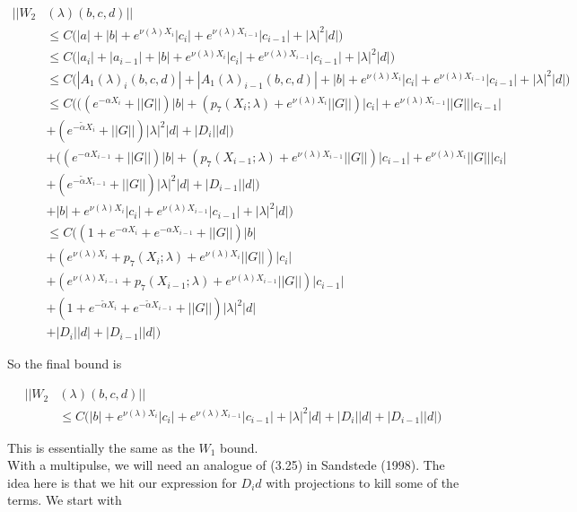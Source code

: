 \documentclass[12pt]{article}
\begin{document}
\begin{align*}
||W_2&(\lambda)(b,c,d)|| \\
&\leq C \Big(|a| + |b| + e^{\nu(\lambda)X_i}|c_i| + e^{\nu(\lambda)X_{i-1}}|c_{i-1}| + |\lambda|^2 |d| \Big) \\
&\leq C \Big(|a_i| + |a_{i-1}| + |b| + e^{\nu(\lambda)X_i}|c_i| + e^{\nu(\lambda)X_{i-1}}|c_{i-1}| + |\lambda|^2 |d| \Big) \\
&\leq C \Big(|A_1(\lambda)_i(b,c,d)| + |A_1(\lambda)_{i-1}(b,c,d)| + |b| + e^{\nu(\lambda)X_i}|c_i| + e^{\nu(\lambda)X_{i-1}}|c_{i-1}| + |\lambda|^2 |d| \Big) \\
&\leq C \Big( ((e^{-\alpha X_i} + ||G||) |b| 
+ ( p_7(X_i; \lambda) + e^{\nu(\lambda)X_i} ||G||) |c_i| + e^{\nu(\lambda)X_{i-1}} ||G|| |c_{i-1}| \\
&+ (e^{-\tilde{\alpha} X_i} + ||G||) |\lambda|^2 |d| + |D_i||d| )\\
&+ ((e^{-\alpha X_{i-1}} + ||G||) |b| 
+ ( p_7(X_{i-1}; \lambda) + e^{\nu(\lambda)X_{i-1}} ||G||) |c_{i-1}| + e^{\nu(\lambda)X_i} ||G|| |c_i| \\
&+ (e^{-\tilde{\alpha} X_{i-1}} + ||G||) |\lambda|^2 |d| + |D_{i-1}||d| )\\
&+ |b| + e^{\nu(\lambda)X_i}|c_i| + e^{\nu(\lambda)X_{i-1}}|c_{i-1}| + |\lambda|^2 |d| \Big) \\
&\leq C \Big( (1 + e^{-\alpha X_i} + e^{-\alpha X_{i-1}} + ||G||)|b|\\
&+ ( e^{\nu(\lambda)X_i} + p_7(X_i; \lambda) + e^{\nu(\lambda)X_i} ||G|| ) |c_i| \\
&+ ( e^{\nu(\lambda)X_{i-1}} + p_7(X_{i-1}; \lambda) + e^{\nu(\lambda)X_{i-1}} ||G||) |c_{i-1}| \\ 
&+ (1 + e^{-\tilde{\alpha} X_i} + e^{-\tilde{\alpha} X_{i-1}} + ||G||)|\lambda|^2 |d| \\
&+ |D_i||d| + |D_{i-1}||d|
\Big)
\end{align*}

So the final bound is

\begin{align*}
||W_2&(\lambda)(b,c,d)|| \\
&\leq C \Big( |b| + e^{\nu(\lambda)X_i} |c_i| + e^{\nu(\lambda)X_{i-1}} |c_{i-1}| 
+ |\lambda|^2 |d| + |D_i||d| + |D_{i-1}||d|)
\end{align*}

This is essentially the same as the $W_1$ bound.\\

With a multipulse, we will need an analogue of (3.25) in Sandstede (1998). The idea here is that we hit our expression for $D_i d$ with projections to kill some of the terms. We start with
\end{document}
